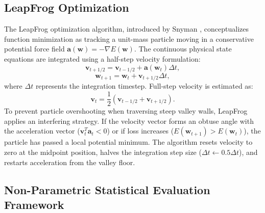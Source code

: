 \documentclass[10pt, conference]{IEEEtran}
\begin{document}
\subsection{LeapFrog Optimization}

The LeapFrog optimization algorithm, introduced by Snyman \cite{snyman1982improved, snyman1983practical}, conceptualizes function minimization as tracking a unit-mass particle moving in a conservative potential force field $\mathbf{a}(\mathbf{w}) = -\nabla E(\mathbf{w})$. The continuous physical state equations are integrated using a half-step velocity formulation:
\begin{equation}
\mathbf{v}_{t+1/2} = \mathbf{v}_{t-1/2} + \mathbf{a}(\mathbf{w}_t) \Delta t,
\end{equation}
\begin{equation}
\mathbf{w}_{t+1} = \mathbf{w}_t + \mathbf{v}_{t+1/2} \Delta t,
\end{equation}
where $\Delta t$ represents the integration timestep. Full-step velocity is estimated as:
\begin{equation}
\mathbf{v}_t = \frac{1}{2} (\mathbf{v}_{t-1/2} + \mathbf{v}_{t+1/2}).
\end{equation}
To prevent particle overshooting when traversing steep valley walls, LeapFrog applies an interfering strategy. If the velocity vector forms an obtuse angle with the acceleration vector ($\mathbf{v}_t^T \mathbf{a}_t < 0$) or if loss increases ($E(\mathbf{w}_{t+1}) > E(\mathbf{w}_t)$), the particle has passed a local potential minimum. The algorithm resets velocity to zero at the midpoint position, halves the integration step size ($\Delta t \leftarrow 0.5 \Delta t$), and restarts acceleration from the valley floor.

\subsection{Non-Parametric Statistical Evaluation Framework}
\end{document}
